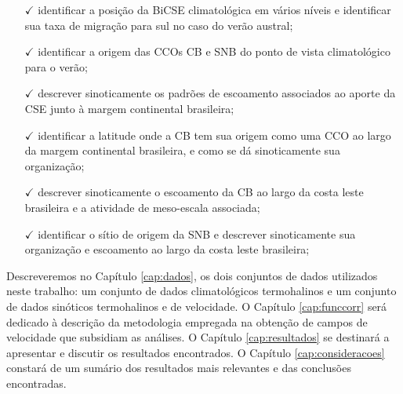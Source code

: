 \begin{itemize}

\item[$\checkmark$] identificar a posição da BiCSE climatológica em vários níveis e identificar sua taxa de migração para
sul no caso do verão austral;

\item[$\checkmark$] identificar a origem das CCOs CB e SNB do ponto de vista climatológico para o verão;

\item[$\checkmark$] descrever sinoticamente os padrões de escoamento associados ao aporte da 
CSE junto à margem continental brasileira;

\item[$\checkmark$] identificar a latitude onde a CB tem sua origem como uma CCO ao largo da 
margem continental brasileira, e como se dá sinoticamente sua organização;

\item[$\checkmark$] descrever sinoticamente o escoamento da CB ao largo da costa leste brasileira
e a atividade de meso-escala associada; 

\item[$\checkmark$] identificar o sítio de origem da SNB e descrever sinoticamente sua organização e 
escoamento ao largo da costa leste brasileira; 

\end{itemize}


Descreveremos no Capítulo \ref{cap:dados}, os dois conjuntos de dados utilizados
neste trabalho: um conjunto de dados climatológicos termohalinos e um conjunto de dados sinóticos termohalinos e de velocidade.
O Capítulo \ref{cap:funccorr} será dedicado à descrição da metodologia empregada na obtenção de campos  
de velocidade que subsidiam as análises. O Capítulo \ref{cap:resultados} se destinará a apresentar e discutir os 
resultados encontrados. O Capítulo \ref{cap:consideracoes} constará de um sumário dos resultados mais
relevantes e das conclusões encontradas.

































